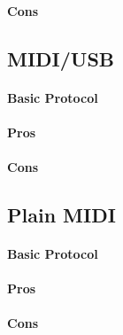 \documentclass[a4paper,10pt]{article}
\begin{document}
\begin{multicols}{2}
\paragraph{Cons}
\TODO


\subsection{MIDI/USB}

\TODO


\paragraph{Basic Protocol}
\TODO


\paragraph{Pros}
\TODO


\paragraph{Cons}
\TODO


\subsection{Plain MIDI}

\TODO


\paragraph{Basic Protocol}
\TODO


\paragraph{Pros}
\TODO


\paragraph{Cons}
\TODO





\end{multicols}
\end{document}
